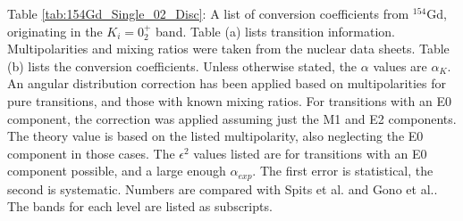 \begin{table}
\begin{ThreePartTable}
        \makeatletter\def\TPT@hsize{}\makeatletter
        
        \begin{tablenotes}
            Table \ref{tab:154Gd_Single_02_Disc}: A list of conversion coefficients from $^{154}$Gd, originating in the $K_i=0^+_2$ band. Table (a) lists transition information. Multipolarities and mixing ratios were taken from the nuclear data sheets\citep{reich09:_nds_154}. Table (b) lists the conversion coefficients. Unless otherwise stated, the $\alpha$ values are $\alpha_K$. An angular distribution correction has been applied based on multipolarities for pure transitions, and those with known mixing ratios. For transitions with an E0 component, the correction was applied assuming just the M1 and E2 components. The theory value is based on the listed multipolarity, also neglecting the E0 component in those cases. The $\epsilon^2$ values listed are for transitions with an E0 component possible, and a large enough $\alpha_{exp}$. The first error is statistical, the second is systematic. Numbers are compared with Spits et al.\citep{spits96:_154gd} and Gono et al.\citep{gono74:_154gd_e0}. The bands for each level are listed as subscripts.
        \end{tablenotes}
\end{ThreePartTable}
\end{table}
